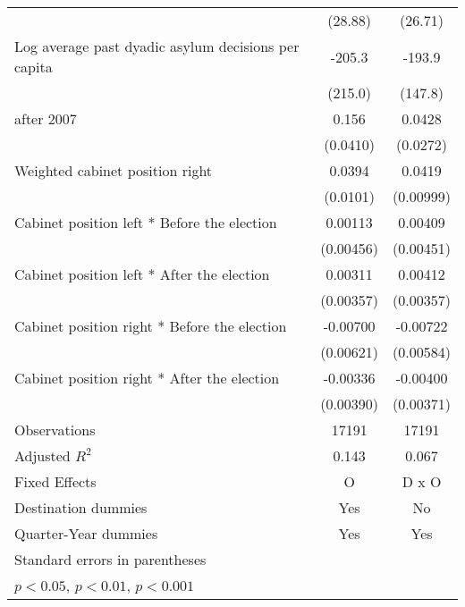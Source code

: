 \begin{table}[htbp]
\begin{tabular}{l*{2}{c}}
                    &     (28.88)         &     (26.71)         \\
[1em]
Log average past dyadic asylum decisions per capita&      -205.3         &      -193.9         \\
                    &     (215.0)         &     (147.8)         \\
[1em]
after 2007          &       0.156\sym{***}&      0.0428         \\
                    &    (0.0410)         &    (0.0272)         \\
[1em]
Weighted cabinet position right&      0.0394\sym{***}&      0.0419\sym{***}\\
                    &    (0.0101)         &   (0.00999)         \\
[1em]
Cabinet position left * Before the election&     0.00113         &     0.00409         \\
                    &   (0.00456)         &   (0.00451)         \\
[1em]
Cabinet position left * After the election&     0.00311         &     0.00412         \\
                    &   (0.00357)         &   (0.00357)         \\
[1em]
Cabinet position right * Before the election&    -0.00700         &    -0.00722         \\
                    &   (0.00621)         &   (0.00584)         \\
[1em]
Cabinet position right * After the election&    -0.00336         &    -0.00400         \\
                    &   (0.00390)         &   (0.00371)         \\
\hline
Observations        &       17191         &       17191         \\
Adjusted \(R^{2}\)  &       0.143         &       0.067         \\
Fixed Effects       &           O         &       D x O         \\
Destination dummies &         Yes         &          No         \\
Quarter-Year dummies&         Yes         &         Yes         \\
\hline\hline
\multicolumn{3}{l}{\footnotesize Standard errors in parentheses}\\
\multicolumn{3}{l}{\footnotesize \sym{*} \(p<0.05\), \sym{**} \(p<0.01\), \sym{***} \(p<0.001\)}\\
\end{tabular}
\end{table}

